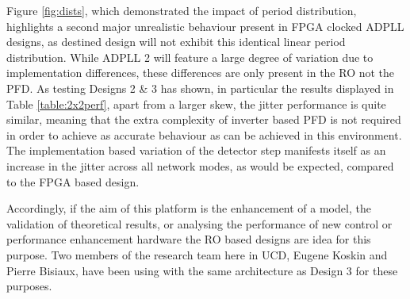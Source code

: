 Figure \ref{fig:dists}, which demonstrated the impact of period distribution, highlights a second major unrealistic behaviour present in \ac{FPGA} clocked \ac{ADPLL} designs, as  destined design will not exhibit this identical linear period distribution. While \ac{ADPLL} 2 will feature a large degree of variation due to implementation differences, these differences are only present in the \ac{RO} not the \ac{PFD}. As testing Designs 2 \& 3 has shown, in particular the results displayed in Table \ref{table:2x2perf}, apart from a larger skew, the jitter performance is quite similar, meaning that the extra complexity of inverter based \ac{PFD} is not required in order to achieve as accurate behaviour as can be achieved in this environment. The implementation based variation of the detector step manifests itself as an increase in the jitter across all network modes, as would be expected, compared to the \ac{FPGA} based design.

Accordingly, if the aim of this platform is the enhancement of a model, the validation of theoretical results, or analysing the performance of new control or performance enhancement hardware the \ac{RO} based designs are idea for this purpose. Two members of the research team here in \acs{UCD}, Eugene Koskin and Pierre Bisiaux, have been using  with the same architecture as Design 3 for these purposes.

